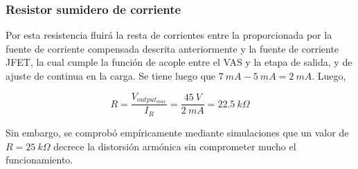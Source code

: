 \subsubsection{Resistor sumidero de corriente}

Por esta resistencia fluirá la resta de corrientes entre la proporcionada por la fuente de corriente compensada descrita anteriormente y la fuente de corriente JFET, la cual cumple la función de acople entre el VAS y la etapa de salida, y de ajuste de continua en la carga. Se tiene luego que $7 \ mA - 5 \ mA = 2 \ mA$. Luego,

\begin{equation}
R = \frac{V_{output_{max}}}{I_R} = \frac{45 \ V}{2 \ mA} = 22.5 \ k\Omega 
\end{equation} 

Sin embargo, se comprobó empíricamente mediante simulaciones que un valor de $R = 25 \ k\Omega$ decrece la distorsión armónica sin comprometer mucho el funcionamiento.

